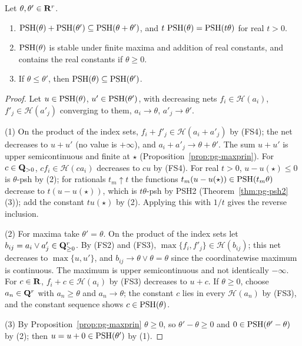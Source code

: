 \begin{theorem}\label{thm:pg-psh-basic}
\leanok
{}
Let $\theta,\theta'\in\mathbf{R}^r$.
\begin{enumerate}
\item $\operatorname{PSH}(\theta)+\operatorname{PSH}(\theta')\subseteq\operatorname{PSH}(\theta+\theta')$, and $t\,\operatorname{PSH}(\theta)=\operatorname{PSH}(t\theta)$ for real $t>0$.
\item $\operatorname{PSH}(\theta)$ is stable under finite maxima and addition of real constants, and contains the real constants if
$\theta\ge0$.
\item If $\theta\le\theta'$, then $\operatorname{PSH}(\theta)\subseteq\operatorname{PSH}(\theta')$.
\end{enumerate}
\end{theorem}

\begin{proof}
Let $u\in\operatorname{PSH}(\theta)$, $u'\in\operatorname{PSH}(\theta')$, with decreasing nets $f_i\in\mathcal H(a_i)$, $f'_j\in\mathcal H(a'_j)$ converging
to them, $a_i\to\theta$, $a'_j\to\theta'$.

(1) On the product of the index sets, $f_i+f'_j\in\mathcal H(a_i+a'_j)$ by (FS4); the net decreases to $u+u'$ (no value is
$+\infty$), and $a_i+a'_j\to\theta+\theta'$. The sum $u+u'$ is upper semicontinuous and finite at $\star$
(Proposition~\ref{prop:pg-maxprin}). For $c\in\mathbf{Q}_{>0}$, $cf_i\in\mathcal H(ca_i)$ decreases to $cu$ by (FS4). For real $t>0$,
$u-u(\star)\le0$ is $\theta$-psh by (2); for rationals $t_m\uparrow t$ the functions $t_m(u-u(\star))\in\operatorname{PSH}(t_m\theta)$
decrease to $t(u-u(\star))$, which is $t\theta$-psh by PSH2 (Theorem~\ref{thm:pg-psh2}(3)); add the constant $tu(\star)$ by
(2). Applying this with $1/t$ gives the reverse inclusion.

(2) For maxima take $\theta'=\theta$. On the product of the index sets let $b_{ij}=a_i\vee a'_j\in\mathbf{Q}^r_{\ge0}$. By (FS2) and
(FS3), $\max\{f_i,f'_j\}\in\mathcal H(b_{ij})$; this net decreases to $\max\{u,u'\}$, and $b_{ij}\to\theta\vee\theta=\theta$ since the
coordinatewise maximum is continuous. The maximum is upper semicontinuous and not identically $-\infty$. For $c\in\mathbf{R}$, $f_i+c\in\mathcal H(a_i)$ by
(FS3) decreases to $u+c$. If $\theta\ge0$, choose $a_n\in\mathbf{Q}^r$ with $a_n\ge\theta$ and $a_n\to\theta$; the constant $c$ lies
in every $\mathcal H(a_n)$ by (FS3), and the constant sequence shows $c\in\operatorname{PSH}(\theta)$.

(3) By Proposition~\ref{prop:pg-maxprin} $\theta\ge0$, so $\theta'-\theta\ge0$ and $0\in\operatorname{PSH}(\theta'-\theta)$ by (2); then
$u=u+0\in\operatorname{PSH}(\theta')$ by (1).
\end{proof}

